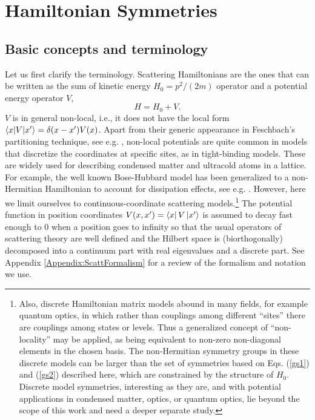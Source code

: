 \section{Hamiltonian Symmetries}
\label{sec:SymTheory}
%
\subsection{Basic concepts and terminology}
%
Let us first clarify the terminology. Scattering Hamiltonians are the ones that can be written as the sum of kinetic energy $H_0 = {p^2}/({2m})$ operator and a potential energy operator $V$,
%
\begin{equation}
    H = H_0 + V.
    \label{eq:ScatteringHamiltonian}
\end{equation}
%
$V$ is in general non-local, i.e., it does not have the local form $\langle x|V|x'\rangle=\delta(x-x')V(x)$.
Apart from their generic appearance in Feschbach's partitioning technique, see e.g. \cite{Ruschhaupt2004a},
non-local potentials   are quite common in models that discretize the coordinates at specific sites, as in tight-binding models.
These are widely used for describing condensed matter and ultracold atoms in a lattice. For example, the well known Bose-Hubbard model has been generalized to a non-Hermitian Hamiltonian to account for dissipation effects, see e.g. \cite{Hiller2006,Zhong2011}. However, here we limit ourselves to continuous-coordinate scattering models.\footnote{
Also, discrete Hamiltonian matrix models abound in many fields, for example quantum optics, in which rather than couplings
among different ``sites'' there are couplings among states or levels.
Thus a generalized concept of ``non-locality'' may be applied,
as being equivalent to non-zero non-diagonal elements in the chosen basis. The non-Hermitian symmetry groups in these discrete models
can be larger than the set of symmetries based on Eqs. (\ref{gs1}) and (\ref{gs2}) described here, which are constrained by the structure of $H_0$. Discrete model symmetries, interesting as they are, and
with potential applications in condensed matter, optics, or quantum optics,
lie beyond the scope of this work and need a deeper separate study.}
The potential function in position coordinates $V(x,x') = \bra{x}V\ket{x'}$ is assumed to decay fast enough to 0 when a position goes to infinity so that the usual operators of scattering theory are well defined and the Hilbert space is (biorthogonally) decomposed into a continuum
part with real eigenvalues and a discrete part. See Appendix \ref{Appendix:ScattFormalism} for a review of the formalism and notation we use.

